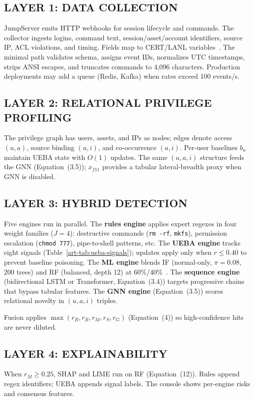 \subsection{LAYER 1: DATA COLLECTION}
JumpServer emits HTTP webhooks for session lifecycle and commands. The collector ingests logins, command text, session/asset/account identifiers, source IP, ACL violations, and timing. Fields map to CERT/LANL variables~\cite{ref10}. The minimal path validates schema, assigns event IDs, normalizes UTC timestamps, strips ANSI escapes, and truncates commands to 4{,}096 characters. Production deployments may add a queue (Redis, Kafka) when rates exceed 100 events/s.

\subsection{LAYER 2: RELATIONAL PRIVILEGE PROFILING}
The privilege graph has users, assets, and IPs as nodes; edges denote access $(u,a)$, source binding $(u,i)$, and co-occurrence $(a,i)$. Per-user baselines $b_u$ maintain UEBA state with $O(1)$ updates. The same $(u,a,i)$ structure feeds the GNN (Equation~(3.5)); $x_{f11}$ provides a tabular lateral-breadth proxy when GNN is disabled.

\subsection{LAYER 3: HYBRID DETECTION}
Five engines run in parallel. The \textbf{rules engine} applies expert regexes in four weight families ($J=4$): destructive commands (\texttt{rm -rf}, \texttt{mkfs}), permission escalation (\texttt{chmod 777}), pipe-to-shell patterns, etc. The \textbf{UEBA engine} tracks eight signals (Table~\ref{art-tab:ueba-signals}); updates apply only when $r\leq 0.40$ to prevent baseline poisoning. The \textbf{ML engine} blends IF (normal-only, $\pi=0.08$, 200 trees) and RF (balanced, depth 12) at 60\%/40\%~\cite{ref9,ref11}. The \textbf{sequence engine} (bidirectional LSTM or Transformer, Equation~(3.4)) targets progressive chains that bypass tabular features. The \textbf{GNN engine} (Equation~(3.5)) scores relational novelty in $(u,a,i)$ triples.

Fusion applies $\max(r_R,r_B,r_M,r_S,r_G)$ (Equation~(4)) so high-confidence hits are never diluted.

\subsection{LAYER 4: EXPLAINABILITY}
When $r_M\geq 0.25$, SHAP and LIME run on RF (Equation~(12)). Rules append regex identifiers; UEBA appends signal labels. The console shows per-engine risks and consensus features.

